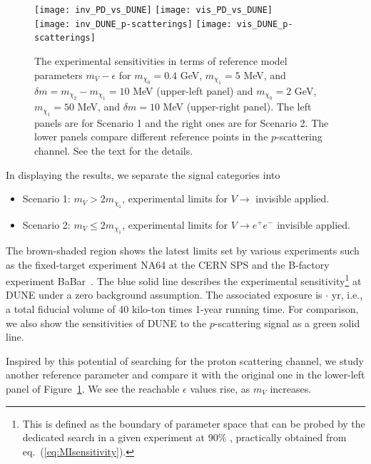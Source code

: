 \begin{figure}[t]
\centering
\texttt{[image: inv\_PD\_vs\_DUNE]} 
\texttt{[image: vis\_PD\_vs\_DUNE]} \\
\vspace{0.3cm}
\texttt{[image: inv\_DUNE\_p-scatterings]}
\texttt{[image: vis\_DUNE\_p-scatterings]}
\caption[Experimental sensitivities for $m_{\chi_n}$ values in terms of $m_V - \epsilon$]{
The experimental sensitivities in terms of reference model parameters $m_V - \epsilon$ 
for $m_{\chi_0} = 0.4$ GeV, $m_{\chi_1} = 5$ MeV, and $\delta m = m_{\chi_2} - m_{\chi_1} = 10$ MeV (upper-left panel) and $m_{\chi_0} = 2$ GeV, $m_{\chi_1} = 50$ MeV, and $\delta m = 10$ MeV (upper-right panel).
The left panels are for Scenario 1 and the right ones are for Scenario 2.
The lower panels compare different reference points in the $p$-scattering channel.
See the text for the details.
\label{fig:darkphotonparameter} }
\end{figure}


In displaying the results, we separate the signal categories into %
\begin{itemize}
\item Scenario 1: $m_V > 2 m_{\chi_1}$, experimental limits for $V \to$ invisible  applied.
\item Scenario 2: $m_V \le 2 m_{\chi_1}$, experimental limits for $V \to e^+ e^-$ invisible  applied.
\end{itemize}

The brown-shaded region shows the latest limits set by various experiments such as the fixed-target experiment NA64 at the CERN SPS and the B-factory experiment BaBar~\cite{Banerjee:2017hhz}.
The blue solid line describes the experimental sensitivity\footnote{This is defined as the boundary of parameter space that can be probed by the dedicated search in a given experiment at 90\% , practically obtained from eq.~(\ref{eq:MIsensitivity}).} at DUNE  under a zero background assumption.
The associated exposure is \fdfiducialmass $\cdot$ yr, i.e., a total fiducial volume of 40 kilo-ton times 1-year running time.
For comparison, we also show the sensitivities of DUNE to the $p$-scattering signal as a green solid line. 

Inspired by this potential of searching for the proton scattering channel, we study another reference parameter and compare it with the original one in the lower-left panel of Figure~\ref{fig:darkphotonparameter}. 
We see the reachable $\epsilon$ values rise, as $m_V$ increases. 


